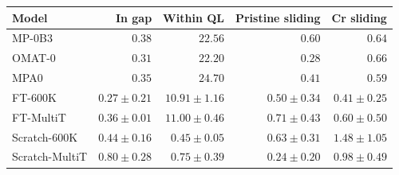 \begin{tabular}{lrrrr}
\toprule
Model & In gap & Within QL & Pristine sliding & Cr sliding \\
\midrule
MP-0B3 & $0.38$ & $22.56$ & $0.60$ & $0.64$ \\
OMAT-0 & $0.31$ & $22.20$ & $0.28$ & $0.66$ \\
MPA0 & $0.35$ & $24.70$ & $0.41$ & $0.59$ \\
FT-600K & $0.27\pm0.21$ & $10.91\pm1.16$ & $0.50\pm0.34$ & $0.41\pm0.25$ \\
FT-MultiT & $0.36\pm0.01$ & $11.00\pm0.46$ & $0.71\pm0.43$ & $0.60\pm0.50$ \\
Scratch-600K & $0.44\pm0.16$ & $0.45\pm0.05$ & $0.63\pm0.31$ & $1.48\pm1.05$ \\
Scratch-MultiT & $0.80\pm0.28$ & $0.75\pm0.39$ & $0.24\pm0.20$ & $0.98\pm0.49$ \\
\bottomrule
\end{tabular}
